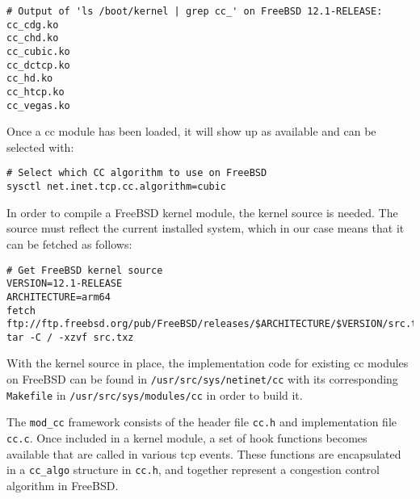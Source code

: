 \begin{verbatim}
# Output of 'ls /boot/kernel | grep cc_' on FreeBSD 12.1-RELEASE:
cc_cdg.ko
cc_chd.ko
cc_cubic.ko
cc_dctcp.ko
cc_hd.ko
cc_htcp.ko
cc_vegas.ko
\end{verbatim}
Once a \gls{cc} module has been loaded, it will show up as available and can be selected with:

\begin{verbatim}
# Select which CC algorithm to use on FreeBSD
sysctl net.inet.tcp.cc.algorithm=cubic
\end{verbatim}
In order to compile a FreeBSD kernel module, the kernel source is needed. The source must reflect the current installed system, which in our case means that it can be fetched as follows:

\begin{verbatim}
# Get FreeBSD kernel source
VERSION=12.1-RELEASE
ARCHITECTURE=arm64
fetch ftp://ftp.freebsd.org/pub/FreeBSD/releases/$ARCHITECTURE/$VERSION/src.txz
tar -C / -xzvf src.txz
\end{verbatim}
With the kernel source in place, the implementation code for existing \gls{cc} modules on FreeBSD can be found in \lstinline{/usr/src/sys/netinet/cc} with its corresponding \lstinline{Makefile} in \lstinline{/usr/src/sys/modules/cc} in order to build it.

The \lstinline{mod_cc} framework consists of the header file \lstinline{cc.h} and implementation file \lstinline{cc.c}. Once included in a kernel module, a set of hook functions becomes available that are called in various \gls{tcp} events. These functions are encapsulated in a \lstinline{cc_algo} structure in \lstinline{cc.h}, and together represent a congestion control algorithm in FreeBSD.

